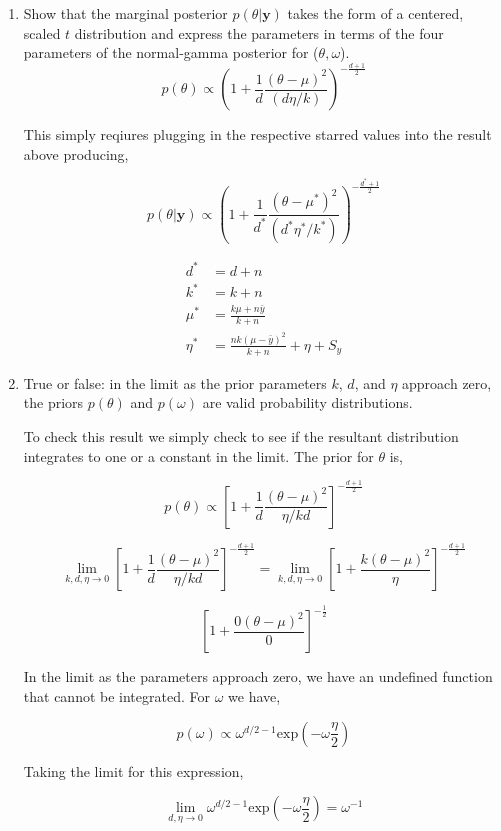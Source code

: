 \documentclass[10pt]{article}
\newcommand{\by}{\mathbf{y}}
\begin{document}
\begin{enumerate}[label=(\Alph*)]
      \item Show that the marginal posterior $p(\theta | \by)$ takes the form of a centered, scaled $t$ distribution and express the parameters in terms of the four parameters of the normal-gamma posterior for ($\theta, \omega$).
        $$p(\theta) \propto \left ( 1 + \frac{1}{d} \frac{(\theta - \mu)^2}{(d \eta/ k)}\right)^{- \frac{d+1}{2}}$$

        This simply reqiures plugging in the respective starred values into the result above producing,

        $$p(\theta | \by) \propto \left ( 1 + \frac{1}{d^*} \frac{(\theta - \mu^*)^2}{(d^* \eta^* / k^*)}\right)^{- \frac{d^*+1}{2}}$$

        \begin{align*}
          d^* &= d+n \\
          k^* &= k+n \\
          \mu^* &= \frac{k\mu + n\bar{y}}{k + n}\\
          \eta^* &= \frac{nk (\mu - \bar{y})^2}{k+n} + \eta + S_y
        \end{align*}

      \item True or false: in the limit as the prior parameters $k$, $d$, and $\eta$ approach zero, the priors $p(\theta)$ and $p(\omega)$ are valid probability distributions.

        To check this result we simply check to see if the resultant distribution integrates to one or a constant in the limit. The prior for $\theta$ is,

        $$p(\theta) \propto \left[ 1 + \frac{1}{d} \frac{(\theta - \mu)^2}{\eta/kd}\right]^{-\frac{d+1}{2}}$$

        $$\lim_{k,d,\eta \to 0} \left[ 1 + \frac{1}{d} \frac{(\theta - \mu)^2}{\eta/kd}\right]^{-\frac{d+1}{2}} = \lim_{k,d,\eta \to 0} \left[ 1 + \frac{k (\theta - \mu)^2}{\eta}\right]^{-\frac{d+1}{2}}$$

        $$\left[ 1 + \frac{0 (\theta - \mu)^2}{0}\right]^{-\frac{1}{2}}$$

        In the limit as the parameters approach zero, we have an undefined function that cannot be integrated. For $\omega$ we have,

        $$p(\omega) \propto \omega^{d/2-1} \text{exp}\left( -\omega \frac{\eta}{2}\right)$$

        Taking the limit for this expression,

        $$\lim_{d, \eta \to 0} \omega^{d/2-1} \text{exp}\left( -\omega \frac{\eta}{2}\right) = \omega^{-1}$$


\end{enumerate}
\end{document}
